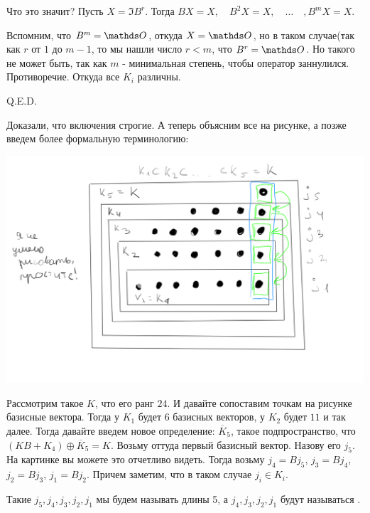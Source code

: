 Что это значит?  Пусть $X = \Im B^r$. Тогда $BX = X,\quad B^2X = X, \quad \ldots \quad, B^mX=X $.

Вспомним, что $B^m = \zero$, откуда $X = \zero$, но в таком случае(так как $r$ от $1$ до $m-1$, то мы нашли число $r<m$, что $B^r=\zero$. Но такого не может быть, так как $m$ - минимальная степень, чтобы оператор заннулился. Противоречие. Откуда все $K_i$ различны.

\hfill Q.E.D.

Доказали, что включения строгие. А теперь объясним все на рисунке, а позже введем более формальную терминологию:

\begin{center}
   \includegraphics[width = 15cm]{assets/7_9-zhordan-sample.png}
\end{center}

Рассмотрим такое $K$, что его ранг $24$. И давайте  сопоставим точкам на рисунке базисные вектора. Тогда у $K_1$ будет $6$ базисных векторов, у $K_2$ будет $11$ и так далее. Тогда давайте введем новое определение: $\overline{K}_5$, такое подпространство, что $(KB + K_4) \oplus \overline{K}_5 = K$. Возьму оттуда первый базисный вектор. Назову его $j_5$. На картинке вы можете это отчетливо видеть. Тогда возьму $j_4 =Bj_5$, $j_3 =Bj_4$, $j_2 =Bj_3$, $j_1 =Bj_2$. Причем заметим, что в таком случае $j_i \in K_i$. 

Такие $j_5,j_4,j_3,j_2,j_1$ мы будем называть  длины 5, а $j_4,j_3,j_2,j_1$ будут называться .

